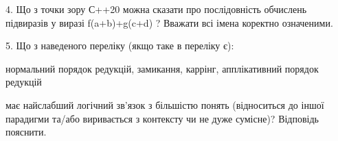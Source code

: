 \documentclass[12pt, ukrainian]{article}
\begin{document}
\begin {large}
{\vspace{5mm}
4. Що з точки зору С++20 можна сказати про послідовність обчислень підвиразів у виразі f(a+b)+g(c+d) ? Вважати всі імена коректно означеними.



\vspace{5mm}
5. Що з наведеного переліку (якщо таке в переліку є):

\vspace{4mm}
\qquad нормальний порядок редукцій, замикання, каррінг, апплікативний порядок редукцій

\vspace{4mm}
має найслабший логічний зв’язок з більшістю понять (відноситься до іншої парадигми та/або виривається з контексту чи не дуже сумісне)? Відповідь пояснити.

}
\end {large}
\end{document}
